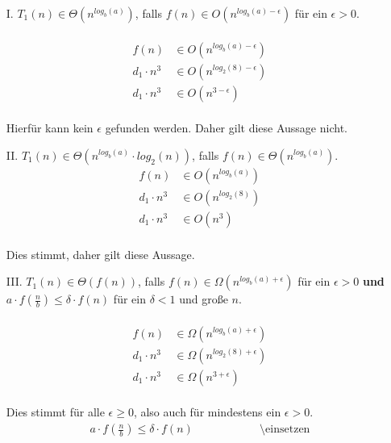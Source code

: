 \documentclass{article}
\begin{document}
   	\begin{enumerate}
   	    \item[I.]
   	    $T_1(n) \in \Theta (n^{log_b(a)})$, falls $f(n) \in O(n^{log_b(a)- \epsilon})$ für ein $\epsilon > 0$.\\
   	    \\
   	    \[
   	        \begin{array}{ll}
   	            f(n) &\in O(n^{log_b(a)- \epsilon})\\
   	            d_1\cdot n^3 &\in O(n^{log_2(8)- \epsilon})\\
   	            d_1\cdot n^3 &\in O(n^{3- \epsilon})
   	        \end{array}
   	    \]
   	    \\
   	    Hierfür kann kein $\epsilon$ gefunden werden. Daher gilt diese Aussage nicht.\\
   	    \item[II.]
   	    $T_1(n) \in \Theta (n^{log_b(a)} \cdot log_2(n))$, falls $f(n) \in \Theta (n^{log_b(a)})$.\\
   	    \[
   	        \begin{array}{ll}
   	            f(n) &\in O(n^{log_b(a)})\\
   	            d_1\cdot n^3 &\in O(n^{log_2(8)})\\
   	            d_1\cdot n^3 &\in O(n^3)
   	        \end{array}
   	    \]
   	    \\
   	    Dies stimmt, daher gilt diese Aussage.
   	    \item[III.]
   	    $T_1(n) \in \Theta (f(n))$, falls $f(n) \in \Omega (n^{log_b(a)+ \epsilon})$ für ein $\epsilon > 0$ \textbf{und} $a \cdot f(\frac{n}{b}) \leq \delta \cdot f(n)$ für ein $\delta < 1$ und große $n$.\\
   	    \\
   	    \[
   	        \begin{array}{ll}
   	            f(n) &\in \Omega (n^{log_b(a)+ \epsilon})\\
   	            d_1\cdot n^3 &\in \Omega (n^{log_2(8)+ \epsilon})\\
   	            d_1\cdot n^3 &\in \Omega (n^{3+ \epsilon})
   	        \end{array}
   	    \]
   	    \\
   	    Dies stimmt für alle $\epsilon \geq 0$, also auch für mindestens ein $\epsilon > 0$.
   	    \[
   	        \begin{array}{lll}
   	            a \cdot f(\frac{n}{b}) \leq \delta \cdot f(n)~~~~~~~~~~~~~~~~~~~~~~~&\text{\textbackslash einsetzen}\\

\end{array}\]
\end{enumerate}
\end{document}
